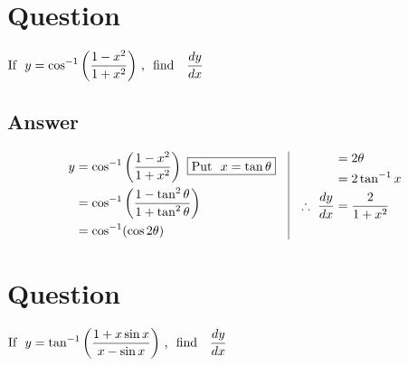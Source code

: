 \documentclass[17pt]{extarticle}
\begin{document}
\noindent
\begin{fleqn} 


\section{Question} 

$\begin{aligned}[t] 
\text{If \ } y =  \cos^{-1}\left(\frac{1 - x^2}{1 + x^2}\right) \text{\,, \  find \ \  } \frac{dy}{dx}
\end{aligned}$

\subsection*{Answer}
\begin{equation} \nonumber
\begin{alignedat}{4}
y &=  \cos^{-1}\left(\frac{1 - x^2}{1 + x^2}\right) \ \boxed{\text{Put \ } x=\tan \theta}\\
  &=  \cos^{-1}\left(\frac{1 - \tan^2\theta}{1 + \tan^2\theta}\right)\\
  &=  \cos^{-1}(\cos 2\theta)\\
\end{alignedat}
\quad
\vrule
\quad 
\begin{alignedat}{4}
&=  2\theta \\
&=  2\tan^{-1}x\\
\therefore \  \frac{dy}{dx} &= \frac{2}{1+x^2}
& \\
& \\
\end{alignedat}
\end{equation}
\section{Question} 

$\begin{aligned}[t] 
\text{If \ } y =  \tan^{-1}\left(\frac{1 + x \sin x}{x - \sin x}\right) \text{\,, \  find \ \  } \frac{dy}{dx}
\end{aligned}$


\end{fleqn}
\end{document}
